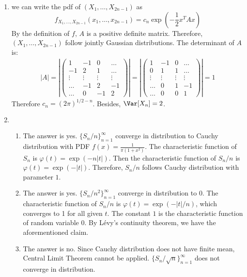 \documentclass{article}
\begin{document}
\begin{enumerate}
\item we can write the pdf of $(X_1, \dots, X_{2n-1})$
as 
$$
f_{X_1, \dots, X_{2n-1}}(x_1, \dots, x_{2n-1})
= c_n \exp(-\frac{1}{2} x^T A x)
$$
By the definition of $f$, $A$ is a positive 
definite matrix. Therefore, $(X_1, \dots, X_{2n-1})$
follow jointly Gaussian distributions. The determinant of $A$ is:
\begin{align*}
    |A|=|\begin{pmatrix}
    1 & -1 & 0 & \dots \\
    -1 & 2 & 1 & \dots \\
    \vdots & \vdots & \vdots & \vdots \\
    \dots & -1 & 2 & -1 \\
    \dots & 0 & -1 & 2
    \end{pmatrix}|
    =|\begin{pmatrix}
    1 & -1 & 0 & \dots \\
    0 & 1 & 1 & \dots \\
    \vdots & \vdots & \vdots & \vdots \\
    \dots & 0 & 1 & -1 \\
    \dots & 0 & 0 & 1
    \end{pmatrix}| = 1
\end{align*}
Therefore $c_n = (2\pi)^{1/2 - n}$. Besides,
$\Var[X_n] = 2$.
\item
\begin{enumerate}[label=(\roman*)]
    \item The answer is yes. $\{S_n / n \}_{n=1}^{\infty}$
    converge in distribution to Cauchy distribution
    with PDF $f(x)=\frac{1}{\pi (1+x^2)}$.
    The characteristic function of $S_n$
    is $\varphi(t)=\exp(-n|t|)$. Then the characteristic
    function of $S_n/n$ is $\varphi(t)=\exp(-|t|)$.
    Therefore, $S_n/n$ follows Cauchy distribution with
    parameter $1$.
    \item The answer is yes. $\{S_n / n^2 \}_{n=1}^{\infty}$
    converge in distribution to $0$. The characteristic
    function of $S_n/n$ is $\varphi(t)=\exp(-|t|/n)$, which
    converges to 1 for all given $t$. The constant $1$
    is the characteristic function of random variable 0.
    By Lévy's continuity theorem, we have the aforementioned claim.
    \item The answer is no. Since Cauchy distribution
    does not have finite mean, Central Limit Theorem
    cannot be applied. $\{S_n / \sqrt{n} \}_{n=1}^{\infty}$
    does not converge in distribution.
\end{enumerate}

\end{enumerate}
\end{document}
